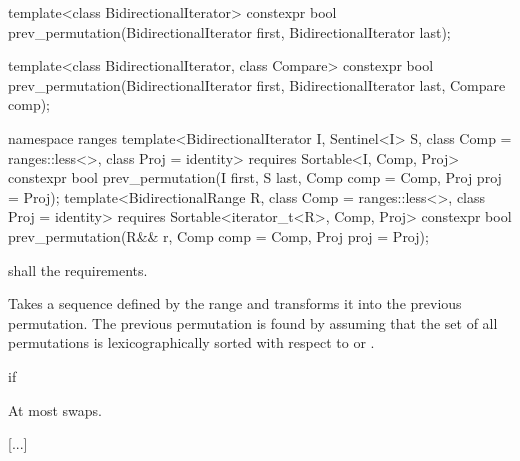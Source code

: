 %
\begin{itemdecl}
template<class BidirectionalIterator>
  constexpr bool prev_permutation(BidirectionalIterator first,
                                  BidirectionalIterator last);

template<class BidirectionalIterator, class Compare>
  constexpr bool prev_permutation(BidirectionalIterator first,
                                  BidirectionalIterator last, Compare comp);
\end{itemdecl}
\begin{addedblock}
\begin{itemdecl}
namespace ranges {
  template<BidirectionalIterator I, Sentinel<I> S, class Comp = ranges::less<>,
      class Proj = identity>
    requires Sortable<I, Comp, Proj>
    constexpr bool
      prev_permutation(I first, S last, Comp comp = Comp{}, Proj proj = Proj{});
  template<BidirectionalRange R, class Comp = ranges::less<>,
      class Proj = identity>
    requires Sortable<iterator_t<R>, Comp, Proj>
    constexpr bool
      prev_permutation(R&& r, Comp comp = Comp{}, Proj proj = Proj{});
}
\end{itemdecl}
\end{addedblock}

\begin{itemdescr}
\pnum
\requires
{}
 shall  the
 requirements.

\pnum
\effects
Takes a sequence defined by the range
and transforms it into the previous permutation.
The previous permutation is found by assuming that the set of all permutations is
lexicographically sorted with respect to
or .

\pnum
\returns
{}
if 

\pnum
\complexity
At most
swaps.
\end{itemdescr}

[...]
